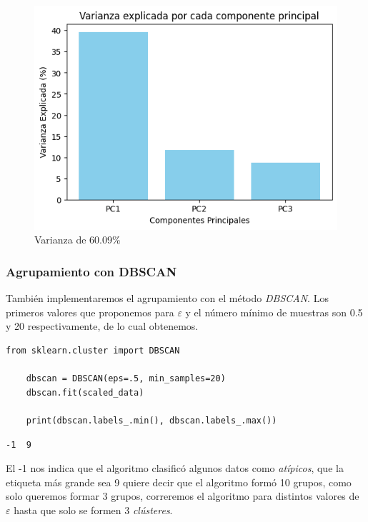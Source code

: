 \begin{figure}[!ht]
    \centering
    \includegraphics[scale = 0.75]{Enrique/Imagenes/varianza_3d.png}
    \caption{Varianza de 60.09\%}
\end{figure}

\subsubsection{Agrupamiento con DBSCAN}

También implementaremos el agrupamiento con el método \textit{DBSCAN}. Los primeros valores que proponemos para $\varepsilon$ y el número mínimo de muestras son 0.5 y 20 respectivamente, de lo cual obtenemos.

\begin{lstlisting}[caption={DSCAN con $\varepsilon$=0.5}]
    from sklearn.cluster import DBSCAN

    dbscan = DBSCAN(eps=.5, min_samples=20)
    dbscan.fit(scaled_data)

    print(dbscan.labels_.min(), dbscan.labels_.max())
\end{lstlisting}

\begin{lstlisting}[caption={Salida del código}]
    -1  9 
\end{lstlisting}

El -1 nos indica que el algoritmo clasificó algunos datos como \textit{atípicos}, que la etiqueta más grande sea 9 quiere decir que el algoritmo formó 10 grupos, como solo queremos formar 3 grupos, correremos el algoritmo para distintos valores de $\varepsilon$ hasta que solo se formen 3 \textit{clústeres}.

